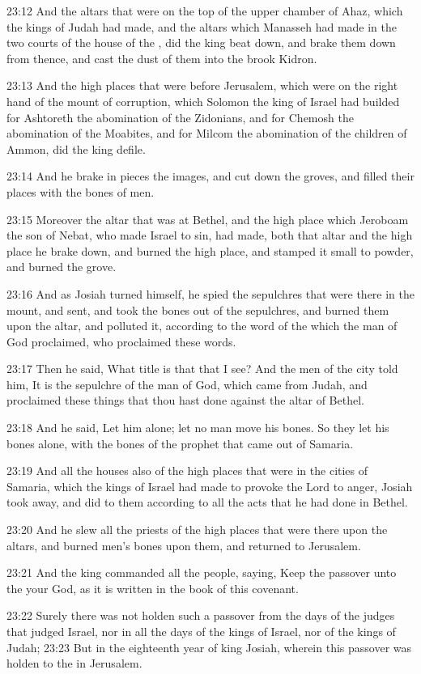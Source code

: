 23:12 And the altars that were on the top of the upper chamber of Ahaz, which the kings of Judah had made, and the altars which Manasseh had made in the two courts of the house of the \LORD, did the king beat down, and brake them down from thence, and cast the dust of them into the brook Kidron.

23:13 And the high places that were before Jerusalem, which were on the right hand of the mount of corruption, which Solomon the king of Israel had builded for Ashtoreth the abomination of the Zidonians, and for Chemosh the abomination of the Moabites, and for Milcom the abomination of the children of Ammon, did the king defile.

23:14 And he brake in pieces the images, and cut down the groves, and filled their places with the bones of men.

23:15 Moreover the altar that was at Bethel, and the high place which Jeroboam the son of Nebat, who made Israel to sin, had made, both that altar and the high place he brake down, and burned the high place, and stamped it small to powder, and burned the grove.

23:16 And as Josiah turned himself, he spied the sepulchres that were there in the mount, and sent, and took the bones out of the sepulchres, and burned them upon the altar, and polluted it, according to the word of the \LORD which the man of God proclaimed, who proclaimed these words.

23:17 Then he said, What title is that that I see? And the men of the city told him, It is the sepulchre of the man of God, which came from Judah, and proclaimed these things that thou hast done against the altar of Bethel.

23:18 And he said, Let him alone; let no man move his bones. So they let his bones alone, with the bones of the prophet that came out of Samaria.

23:19 And all the houses also of the high places that were in the cities of Samaria, which the kings of Israel had made to provoke the Lord to anger, Josiah took away, and did to them according to all the acts that he had done in Bethel.

23:20 And he slew all the priests of the high places that were there upon the altars, and burned men's bones upon them, and returned to Jerusalem.

23:21 And the king commanded all the people, saying, Keep the passover unto the \LORD your God, as it is written in the book of this covenant.

23:22 Surely there was not holden such a passover from the days of the judges that judged Israel, nor in all the days of the kings of Israel, nor of the kings of Judah; 23:23 But in the eighteenth year of king Josiah, wherein this passover was holden to the \LORD in Jerusalem.

